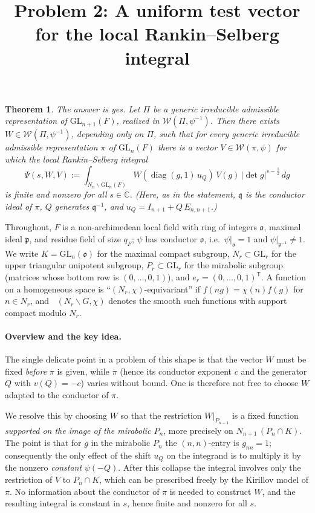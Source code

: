 \documentclass[12pt]{article}
\title{Problem 2: A uniform test vector for the local Rankin--Selberg integral}
\author{}
\date{}
\newcommand{\GL}{\mathrm{GL}}
\newcommand{\oo}{\mathfrak{o}}
\newcommand{\pp}{\mathfrak{p}}
\newcommand{\qq}{\mathfrak{q}}
\newcommand{\Wmod}{\mathcal{W}}
\newcommand{\diag}{\operatorname{diag}}
\DeclareMathOperator{\Cc}{C_c^\infty}
\newtheorem{theorem}{Theorem}
\begin{document}
\maketitle

\begin{theorem}
The answer is \emph{yes}. Let $\Pi$ be a generic irreducible admissible
representation of $\GL_{n+1}(F)$, realized in $\Wmod(\Pi,\psi^{-1})$. Then there
exists $W\in\Wmod(\Pi,\psi^{-1})$, depending only on $\Pi$, such that for every
generic irreducible admissible representation $\pi$ of $\GL_n(F)$ there is a vector
$V\in\Wmod(\pi,\psi)$ for which the local Rankin--Selberg integral
\[
  \Psi(s,W,V):=\int_{N_n\backslash \GL_n(F)} W(\diag(g,1)\,u_Q)\,V(g)\,|\det g|^{s-\frac12}\,dg
\]
is finite and nonzero for all $s\in\mathbb C$. (Here, as in the statement,
$\qq$ is the conductor ideal of $\pi$, $Q$ generates $\qq^{-1}$, and
$u_Q=I_{n+1}+Q\,E_{n,n+1}$.)
\end{theorem}

Throughout, $F$ is a non-archimedean local field with ring of integers $\oo$,
maximal ideal $\pp$, and residue field of size $q_F$; $\psi$ has conductor $\oo$,
i.e.\ $\psi|_{\oo}=1$ and $\psi|_{\pp^{-1}}\neq1$. We write $K=\GL_n(\oo)$ for the
maximal compact subgroup, $N_r\subset\GL_r$ for the upper triangular unipotent
subgroup, $P_r\subset\GL_r$ for the mirabolic subgroup (matrices whose bottom row
is $(0,\dots,0,1)$), and $e_r=(0,\dots,0,1)^{\mathsf T}$. A function on a
homogeneous space is ``$(N_r,\chi)$-equivariant'' if $f(ng)=\chi(n)f(g)$ for
$n\in N_r$, and $\Cc(N_r\backslash G,\chi)$ denotes the smooth such functions with
support compact modulo $N_r$.

\paragraph{Overview and the key idea.}
The single delicate point in a problem of this shape is that the vector $W$ must be
fixed \emph{before} $\pi$ is given, while $\pi$ (hence its conductor exponent $c$
and the generator $Q$ with $v(Q)=-c$) varies without bound. One is therefore not
free to choose $W$ adapted to the conductor of $\pi$.

We resolve this by choosing $W$ so that the restriction
$W|_{P_{n+1}}$ is a fixed function \emph{supported on the image of the mirabolic
$P_n$}, more precisely on $N_{n+1}\,(P_n\cap K)$. The point is that for
$g$ in the mirabolic $P_n$ the $(n,n)$-entry is $g_{nn}=1$; consequently the only
effect of the shift $u_Q$ on the integrand is to multiply it by the nonzero
\emph{constant} $\psi(-Q)$. After this collapse the integral involves only the
restriction of $V$ to $P_n\cap K$, which can be prescribed freely by the Kirillov
model of $\pi$. No information about the conductor of $\pi$ is needed to construct
$W$, and the resulting integral is constant in $s$, hence finite and nonzero for
all $s$.
\end{document}

